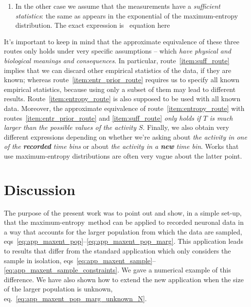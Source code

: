 \documentclass[\ifafour a4paper,12pt,\else a5paper,10pt,\fi%
onecolumn,oneside,article,%
british%
]{memoir}
\makeatletter
\theoremstyle{remark}
\theoremstyle{innote}
\def\sum{\DOTSI\sumop\slimits@}
\def\prod{\DOTSI\prodop\slimits@}
\newcommand*{\delt}{\deltaup}%
\newcommand*{\di}{\mathrm{d}}%
\newcommand*{\pf}{\mathrm{p}}%
\newcommand*{\p}{\mathrm{P}}%
\renewcommand*{\|}{\nonscript\,\vert\nonscript\;\mathopen{}}
\newcommand*{\eqn}{eq.}%
\newcommand*{\eqns}{eqs}%
\newcommand*{\tprod}{\mathop{\textstyle\prod}\nolimits}
\newcommand*{\tsum}{\mathop{\textstyle\sum}\nolimits}
\newcommand*{\puzzle}{{\fontencoding{U}\fontfamily{fontawesometwo}\selectfont\symbol{225}}}
\newcommand{\mynote}[1]{ {\color{notecolour}\puzzle\ #1}}
\newcommand*{\yRv}{S}
\newcommand*{\yrv}{s}
\newcommand*{\yr}{\bm{\yrv}}%
\newcommand*{\yRf}{\yRv}%
\newcommand*{\yl}{\bm{l}}
\newcommand*{\yk}{z}
\newcommand*{\me}{maximum-entropy}
\makeatother
\begin{document}
\begin{enumerate}[wide,label=(\alph*)]
\item \label{item:suff_route}In the other case we assume that the
  measurements have a \emph{sufficient statistics}: the same as appears in
  the exponential of the maximum-entropy distribution. The exact expression is\mynote{equation here}
\end{enumerate}

It's important to keep in mind that the approximate equivalence of these
three routes only holds under very specific assumptions -- which \emph{have
  physical and biological meanings and consequences}. In particular,
route~\ref{item:suff_route} implies that we can discard other empirical
statistics of the data, if they are known; whereas
route~\ref{item:entr_prior_route} requires us to specify all known
empirical statistics, because using only a subset of them may lead to
different results. Route~\ref{item:entropy_route} is also supposed to be
used with all known data. Moreover, the approximate equivalence of
route~\ref{item:entropy_route} with routes~\ref{item:entr_prior_route} and
\ref{item:suff_route} \emph{only holds if $T$ is much larger than the
  possible values of the activity $\yRf$}. Finally, we also obtain very
different expressions depending on whether we're asking about \emph{the
  activity in one of the \textbf{recorded} time bins} or about \emph{the
  activity in a \textbf{new} time bin}. Works that use maximum-entropy
distributions are often very vague about the latter point.



\section{Discussion}
\label{sec:discussion}

The purpose of the present work was to point out and show, in a simple
set-up, that the \me\ method can be applied to recorded neuronal data in a
way that accounts for the larger population from which the data are
sampled, \eqns~\eqref{eq:app_maxent_pop}--\eqref{eq:app_maxent_pop_marg}.
This application leads to results that differ from the standard application
which only considers the sample in isolation,
\eqns~\eqref{eq:app_maxent_sample}--\eqref{eq:app_maxent_sample_constraints}.
We gave a numerical example of this difference. We have also shown how to
extend the new application when the size of the larger population is
unknown, \eqn~\eqref{eq:app_maxent_pop_marg_unknown_N}.
\end{document}
